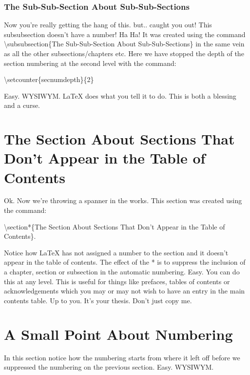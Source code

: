 \subsubsection{The Sub-Sub-Section About Sub-Sub-Sections}
\label{sec:SubSubSection}
Now you're really getting the hang of this. but.. caught you out! This subsubsection doesn't have a number!  Ha Ha! It was created using the command {\textbackslash}subsubsection\{The Sub-Sub-Section About Sub-Sub-Sections\} in the same vein as all the other subsections/chapters etc. Here we have stopped the depth of the section numbering at the second level with the command:

\vspace*{2ex}

{\textbackslash}setcounter\{secnumdepth\}\{2\}

\vspace*{2ex}

Easy. WYSIWYM.  LaTeX does what you tell it to do. This is both a blessing and a curse.

\pagebreak
\section*{The Section About Sections That Don't Appear in the Table of Contents}
\label{sec:InvisibleSection}
Ok. Now we're throwing a spanner in the works. This section was created using the command:

\vspace*{2ex}

{\textbackslash}section*\{The Section About Sections That Don't Appear in the Table of Contents\}. 

\vspace*{2ex}

Notice how LaTeX has not assigned a number to the section and it doesn't appear in the table of contents. The effect of the * is to suppress the inclusion of a chapter, section or subsection in the automatic numbering. Easy. You can do this at any level. This is useful for things like prefaces, tables of contents or acknowledgements which you may or may not wish to have an entry in the main contents table. Up to you. It's your thesis. Don't just copy me.

\section{A Small Point About Numbering}

In this section notice how the numbering starts from where it left off before we suppressed the numbering on the previous section. Easy. WYSIWYM.
\pagebreak
